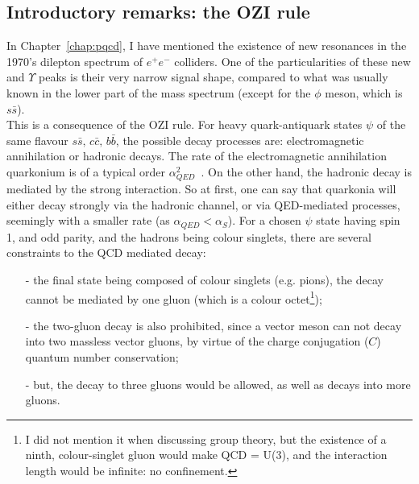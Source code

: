 \subsection{Introductory remarks: the OZI rule}
\label{sec:OZI}
In Chapter~\ref{chap:pqcd}, I have mentioned the existence of new
resonances in the 1970's dilepton spectrum of $e^{+}e^{-}$
colliders. One of the particularities of these new \Jpsi and $\Upsilon$ peaks
is their very narrow signal shape, compared to what was usually known in the
lower part of the mass spectrum (except for the $\phi$ meson, which is
$s\bar{s}$). 
\\
This is a consequence of the OZI
rule. For heavy quark-antiquark states $\psi$ of the same flavour $s\bar{s},\,
c\bar{c},\, b\bar{b}$, the possible decay processes are: electromagnetic
annihilation or hadronic decays. The rate of the electromagnetic
annihilation quarkonium is of a typical order
$\alpha_{QED}^{2}$~\cite{gatto}. On the other hand, the hadronic 
decay is mediated by the strong interaction. So at first, one can say
that quarkonia will either decay strongly via the hadronic channel, or
via QED-mediated processes, seemingly with a smaller rate (as
$\alpha_{QED} < \alpha_{S}$). For a chosen $\psi$ state having
spin 1, and odd parity, and the hadrons being colour singlets, there
are several constraints to the QCD mediated decay:
\begin{itemize}
\item[-] the final state being composed of colour singlets
  (e.g. pions), the decay cannot be mediated by one gluon (which is a
  colour octet\footnote{I did not mention it when discussing group
    theory, but the existence of a ninth, colour-singlet gluon would
    make QCD = U(3), and the interaction length would be infinite: no confinement.});
\item[-] the two-gluon decay is also prohibited, since a vector
  meson can not decay into two massless vector gluons, by virtue of
  the charge conjugation ($C$) quantum number conservation;
\item[-] but, the decay to three gluons would be allowed, as well as
  decays into more gluons.
\end{itemize}



